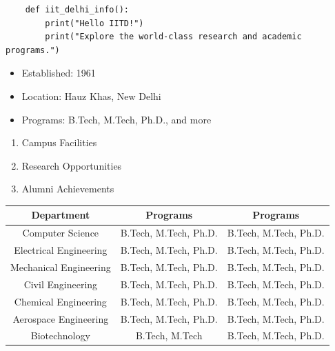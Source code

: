 \documentclass{article}
\begin{document}
\begin{verbatim}
    def iit_delhi_info():
        print("Hello IITD!")
        print("Explore the world-class research and academic programs.")
\end{verbatim}


\begin{itemize}
    \item Established: 1961
    \item Location: Hauz Khas, New Delhi
    \item Programs: B.Tech, M.Tech, Ph.D., and more
\end{itemize}

\begin{enumerate}
    \item Campus Facilities
    \item Research Opportunities
    \item Alumni Achievements
\end{enumerate}



\begin{tabular}{|c|c|c|}
    \hline
    Department & Programs & Programs \\
    \hline
    Computer Science & B.Tech, M.Tech, Ph.D. & B.Tech, M.Tech, Ph.D. \\
    Electrical Engineering & B.Tech, M.Tech, Ph.D. & B.Tech, M.Tech, Ph.D. \\
    Mechanical Engineering & B.Tech, M.Tech, Ph.D. & B.Tech, M.Tech, Ph.D. \\
    Civil Engineering & B.Tech, M.Tech, Ph.D. & B.Tech, M.Tech, Ph.D. \\
    Chemical Engineering & B.Tech, M.Tech, Ph.D. & B.Tech, M.Tech, Ph.D. \\
    Aerospace Engineering & B.Tech, M.Tech, Ph.D. & B.Tech, M.Tech, Ph.D. \\
    Biotechnology & B.Tech, M.Tech & B.Tech, M.Tech, Ph.D. \\
    \hline
\end{tabular}
\end{document}
